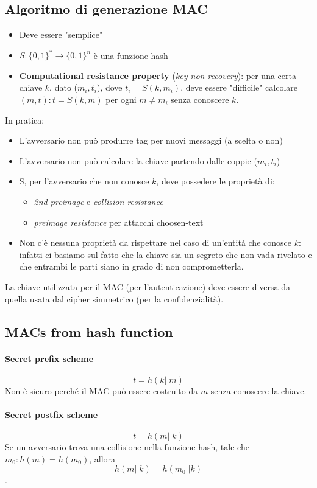 \documentclass[a4paper,12pt]{article}
\begin{document}
\subsection{Algoritmo di generazione MAC}
\begin{itemize}
	\item Deve essere "semplice"
	\item $S : \{0,1\}^* \rightarrow \{0,1\}^n$ è una funzione hash				
	\item \textbf{Computational resistance property} (\textit{key non-recovery}): per una certa chiave $k$, dato ($m_i, t_i$), dove $t_i = S(k, m_i)$, deve essere "difficile" calcolare $(m, t) : t = S(k, m)$ per ogni $m \neq m_i$ senza conoscere $k$.
\end{itemize}
In pratica:
\begin{itemize}
	\item L'avversario non può produrre tag per nuovi messaggi (a scelta o non)
	\item L'avversario non può calcolare la chiave partendo dalle coppie ($m_i, t_i$)
	\item S, per l'avversario che non conosce $k$, deve possedere le proprietà di:
	\begin{itemize}
		\item \textit{2nd-preimage} e \textit{collision resistance}
		\item \textit{preimage resistance} per attacchi choosen-text
	\end{itemize}
	\item Non c'è nessuna proprietà da rispettare nel caso di un'entità che conosce $k$:
	infatti ci basiamo sul fatto che la chiave sia un segreto che non vada rivelato e che entrambi le parti siano in grado di non comprometterla.
\end{itemize}
La chiave utilizzata per il MAC (per l'autenticazione) deve essere diversa da quella usata dal cipher simmetrico (per la confidenzialità).

\subsection{MACs from hash function}
\paragraph{Secret prefix scheme} 
$$t = h(k||m)$$
Non è sicuro perché il MAC può essere costruito da $m$ senza conoscere la chiave.

\paragraph{Secret postfix scheme}
$$t = h(m||k)$$
Se un avversario trova una collisione nella funzione hash, tale che $m_0 : h(m) = h(m_0)$, allora $$h(m||k) = h(m_0||k)$$.
\end{document}
